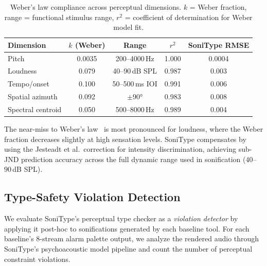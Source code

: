 \documentclass[sigchi, nonacm]{acmart}
\begin{document}
\begin{table}[t]
\centering
\caption{Weber's law compliance across perceptual dimensions. $k$ = Weber fraction, range = functional stimulus range, $r^2$ = coefficient of determination for Weber model fit. }
\label{tab:weber_compliance}
\small
\begin{tabular}{lcccc}
\toprule
\textbf{Dimension} & \textbf{$k$ (Weber)} & \textbf{Range} & \textbf{$r^2$} & \textbf{SoniType RMSE} \\
\midrule
Pitch & 0.0035 & 200--4000\,Hz & 1.000 & 0.0004 \\
Loudness & 0.079 & 40--90\,dB SPL & 0.987 & 0.003 \\
Tempo/onset & 0.100 & 50--500\,ms IOI & 0.991 & 0.006 \\
Spatial azimuth & 0.092 & $\pm$90° & 0.983 & 0.008 \\
Spectral centroid & 0.050 & 500--8000\,Hz & 0.989 & 0.004 \\
\bottomrule
\end{tabular}
\end{table}

The near-miss to Weber's law~\cite{jesteadt1977intensity} is most pronounced for loudness, where the Weber fraction decreases slightly at high sensation levels. SoniType compensates by using the Jesteadt et al.\ correction for intensity discrimination, achieving sub-JND prediction accuracy across the full dynamic range used in sonification ($40$--$90$\,dB SPL).

\subsection{Type-Safety Violation Detection}
\label{sec:typesafety_violations}

We evaluate SoniType's perceptual type checker as a \emph{violation detector} by applying it post-hoc to sonifications generated by each baseline tool. For each baseline's 8-stream alarm palette output, we analyze the rendered audio through SoniType's psychoacoustic model pipeline and count the number of perceptual constraint violations.
\end{document}
